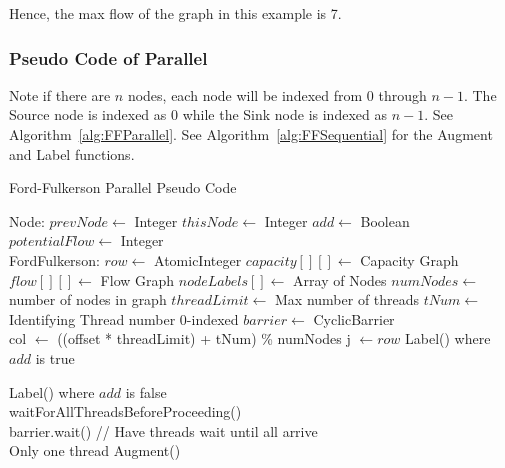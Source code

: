         Hence, the max flow of the graph in this example is 7.
        
    \subsubsection{Pseudo Code of Parallel}
        Note if there are $n$ nodes, each node will be indexed from 0 through $n-1$. The Source node is indexed as 0 while the Sink node is indexed as $n-1$. See Algorithm~\ref{alg:FFParallel}. See Algorithm~\ref{alg:FFSequential} for the Augment and Label functions.
        \begin{algorithm}
            \caption{Ford-Fulkerson Parallel Pseudo Code}
            \label{alg:FFParallel}
            \begin{algorithmic}[1]
                \State Node:
                    \State $prevNode \gets$ Integer
                    \State $thisNode \gets$ Integer
                    \State $add \gets$ Boolean
                    \State $potentialFlow \gets$ Integer\\
                    
                \State FordFulkerson:
                    \State $row \gets$ AtomicInteger
                    \State $capacity[][] \gets$ Capacity Graph
                    \State $flow[][] \gets$ Flow Graph
                    \State $nodeLabels[] \gets$ Array of Nodes
                    \State $numNodes \gets$ number of nodes in graph
                    \State $threadLimit \gets$ Max number of threads
                    \State $tNum \gets$ Identifying Thread number 0-indexed
                    \State $barrier \gets$ CyclicBarrier
                    \\
                    
                        \State col $\gets$ ((offset * threadLimit) + tNum) \% numNodes
                            \State j $\gets row$
                                \State
                                        Label() where $add$ is true
                                    \EndIf
                                    
                                        Label() where $add$ is false
                                    \EndIf
                            \EndIf\\
                            waitForAllThreadsBeforeProceeding()
                        \EndFor
                         \\
                            barrier.wait() // Have threads wait until all arrive\\
                            Only one thread Augment()\\
                            

\end{algorithmic}
\end{algorithm}

